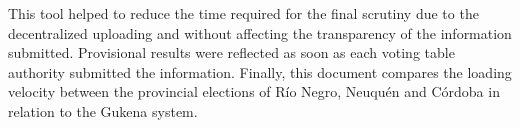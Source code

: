 This tool helped to reduce the time required for the final scrutiny due to the decentralized uploading and without affecting the transparency of the information submitted. Provisional results were reflected as soon as each voting table authority submitted the information.\newline
Finally, this document compares the loading velocity between the provincial elections of Río Negro, Neuquén and Córdoba in relation to the Gukena system.

\vfill
\pagebreak
